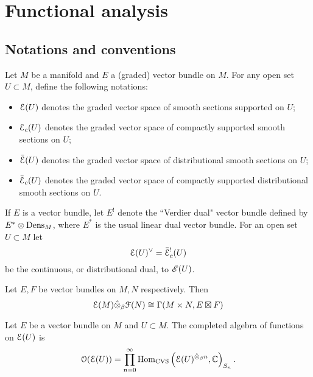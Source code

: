 \documentclass[10pt, oneside]{article}
\begin{document}
\appendix

\section{Functional analysis}

\def\CVS{{\rm CVS}}
\def\DVS{{\rm DVS}}


\subsection{Notations and conventions}

\begin{dfn}
Let $M$ be a manifold and $E$ a (graded) vector bundle on $M$.  
For any open set $U \subset M$, define the following notations:
\begin{itemize}
\item $\mathcal E(U)$ denotes the graded vector space of smooth sections supported on $U$;
\item $\mathcal E_c(U)$ denotes the graded vector space of compactly supported smooth sections on $U$;
\item $\Bar{\mathcal E}(U)$ denotes the graded vector space of distributional smooth sections on $U$;
\item $\Bar{\mathcal E}_c(U)$ denotes the graded vector space of compactly supported distributional smooth sections on $U$.
\end{itemize}
\end{dfn}

If $E$ is a vector bundle, let $E^!$ denote the ``Verdier dual" vector bundle defined by $E^* \otimes {\rm Dens}_M$, where $E^*$ is the usual linear dual vector bundle. 
For an open set $U \subset M$ let 
\[
\mathcal E(U)^\vee = \Bar{\mathcal E}^!_c(U)
\]
be the continuous, or distributional dual, to $\mathscr E(U)$. 

\begin{prop}
Let $E,F$ be vector bundles on $M,N$ respectively.
Then
\[
\mathcal E(M) \Hat{\otimes}_\beta \mathcal F(N) \cong \Gamma(M \times N, E \boxtimes F)
\]
\end{prop}

\begin{dfn}
Let $E$ be a vector bundle on $M$ and $U \subset M$.
The completed algebra of functions on $\mathcal E(U)$ is
\[
\mathcal O(\mathcal E(U)) = \prod_{n = 0}^\infty {\rm Hom}_{\rm CVS} \left(\mathcal E(U)^{\Hat{\otimes}_\beta n}, \mathbb C\right)_{S_n} .
\]
\end{dfn}
\end{document}
